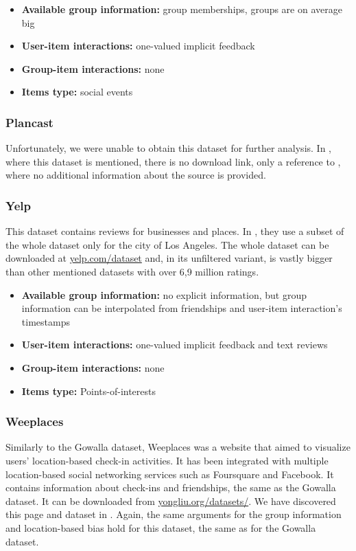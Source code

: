 \begin{itemize}
    \item \textbf{Available group information:} group memberships, groups are on average big
    \item \textbf{User-item interactions:} one-valued implicit feedback
    \item \textbf{Group-item interactions:} none
    \item \textbf{Items type:} social events
\end{itemize}


\subsubsection{Plancast} \label{subsubsec:04_group_datasets.overview.plancast}
Unfortunately, we were unable to obtain this dataset for further analysis. In \cite{meetup_plancast}, where this dataset is mentioned, there is no download link, only a reference to \cite{plancast_origin}, where no additional information about the source is provided.

\subsubsection{Yelp}\label{subsubsec:04_group_datasets.overview.yelp}
This dataset contains reviews for businesses and places. In \cite{gowalla_weeplaces_yelp}, they use a subset of the whole dataset only for the city of Los Angeles. The whole dataset can be downloaded at \href{https://www.yelp.com/dataset}{yelp.com/dataset} and, in its unfiltered variant, is vastly bigger than other mentioned datasets with over 6,9 million ratings.

\begin{itemize}
    \item \textbf{Available group information:} no explicit information, but group information can be interpolated from friendships and user-item interaction's timestamps
    \item \textbf{User-item interactions:} one-valued implicit feedback and text reviews
    \item \textbf{Group-item interactions:} none
    \item \textbf{Items type:} Points-of-interests
\end{itemize}


\subsubsection{Weeplaces} \label{subsubsec:04_group_datasets.overview.weeplaces}
Similarly to the Gowalla dataset, Weeplaces was a website that aimed to visualize users' location-based check-in activities. It has been integrated with multiple location-based social networking services such as Foursquare and Facebook.
It contains information about check-ins and friendships, the same as the Gowalla dataset. It can be downloaded from \href{https://www.yongliu.org/datasets/}{yongliu.org/datasets/}. We have discovered this page and dataset in \cite{gowalla_weeplaces_yelp}.
Again, the same arguments for the group information and location-based bias hold for this dataset, the same as for the Gowalla dataset. 

